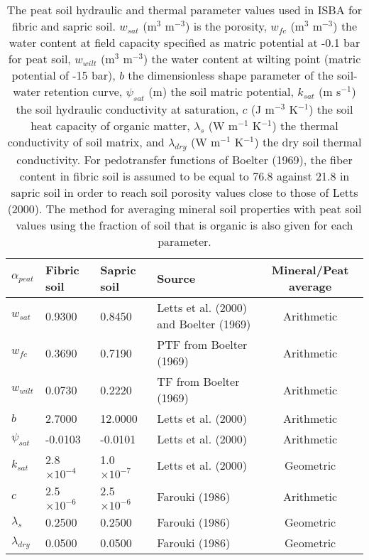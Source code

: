 \begin{table}[h]
\caption{
The peat soil hydraulic and thermal parameter values used in ISBA for
fibric and sapric soil. $w_{sat}$ (m$^{3}$ m$^{-3}$) 
is the porosity, $w_{fc}$ (m$^{3}$ m$^{-3}$) 
the water content at field capacity specified as matric potential at
-0.1 bar for peat soil, $w_{wilt}$ (m$^{3}$ m$^{-3}$) 
the water content at wilting
point (matric potential of -15 bar), $b$ the dimensionless shape
parameter of the soil-water retention curve, $\psi_{sat}$ (m) 
the soil matric
potential, $k_{sat}$ (m s$^{-1}$) 
the soil hydraulic conductivity at saturation,
$c$ (J m$^{-3}$ K$^{-1}$) the soil heat capacity of organic matter, 
$\lambda_s$ (W m$^{-1}$ K$^{-1}$)
the thermal conductivity of soil matrix, and $\lambda_{dry}$
(W m$^{-1}$ K$^{-1}$) the dry
soil thermal conductivity. For pedotransfer functions of 
Boelter (1969)\nocite{Boelter_1969}, 
the fiber content in fibric soil is assumed to be equal to
76.8 against 21.8 
in sapric soil in order to reach soil porosity
values close to those of Letts \etal (2000)\nocite{Letts_ea_2000}. The method for averaging
mineral soil properties with peat soil values using the
fraction of soil that is organic is also given for each parameter.
}
\begin{center}
\begin{footnotesize}
\begin{tabular}{llllc}
\hline
$\alpha_{peat}$ & Fibric soil & Sapric soil & Source & Mineral/Peat average \\
\hline
\hline
$w_{sat}$         & 0.9300             &   0.8450          
&    Letts et al. (2000) and Boelter (1969)
&    Arithmetic \\
$w_{fc}$          &  0.3690             &   0.7190          
&     PTF from Boelter (1969) 
&   Arithmetic  \\
$w_{wilt}$       &  0.0730             &   0.2220          
&    TF from Boelter (1969)  
&   Arithmetic  \\
$b$                & 2.7000              &   12.0000         
&     Letts et al. (2000)
&  Arithmetic  \\ 
$\psi_{sat}$     &  -0.0103            &   -0.0101         
&    Letts et al. (2000) 
&  Arithmetic  \\ 
$k_{sat}$        &  2.8$\times 10^{-4}$  & 1.0$\times 10^{-7}$ 
&    Letts et al. (2000)
&  Geometric \\
$c$                & 2.5$\times 10^{-6}$   & 2.5$\times 10^{-6}$ 
&    Farouki (1986)
&    Arithmetic \\
$\lambda_{s}$     &  0.2500             &   0.2500          
&    Farouki (1986) 
&  Geometric   \\
$\lambda_{dry}$  &  0.0500             &   0.0500          
&    Farouki (1986) 
&   Geometric  \\
\hline
\end{tabular}
\end{footnotesize}
\end{center}
\label{soil_organic_params}
\end{table}

